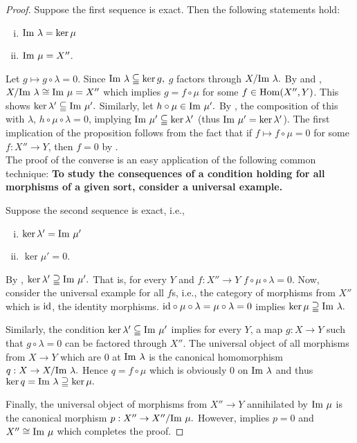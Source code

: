     
    \begin{proof}
    Suppose the first sequence is exact. Then the following statements hold:
    \begin{enumerate}[(i)]
        \item $\mathrm{Im}\  \lambda = \ker \mu$ \label{item:1}
        \item $\mathrm{Im}\  \mu = X''$.\label{item:2}
    \end{enumerate}
    Let $g \mapsto g \circ \lambda = 0$. Since $\mathrm{Im}\  \lambda \subseteqq  \ker g,$ $g$ factors through $X/\mathrm{Im}\  \lambda.$ By  and , $X/\mathrm{Im}\  \lambda \cong \mathrm{Im}\  \mu =  X''$ which implies $g = f \circ \mu$ for some $f \in \mathrm{Hom} (X'', Y)$. This shows $\ker \lambda' \subseteqq \mathrm{Im}\  \mu'.$ Similarly, let  $h \circ \mu \in \mathrm{Im}\  \mu'.$ By , the composition of this with $\lambda$, $h \circ \mu \circ \lambda = 0$, implying $\mathrm{Im}\  \mu' \subseteqq \ker \lambda'$ (thus $\mathrm{Im}\  \mu' = \ker \lambda'$).
    The first implication of the proposition follows from the fact that if $f \mapsto f \circ \mu = 0$ for some $f: X'' \to Y$, then $f = 0$  by .
    \\

    The proof of the converse is an easy application of the following common technique: \textbf{To study the consequences of a condition holding for all morphisms of a given sort, consider a universal example.}

    Suppose the second sequence is exact, i.e.,
    \begin{enumerate}[(i)]
        \item $\ker \lambda'  =  \mathrm{Im}\  \mu'$ \label{item:3}
        \item $\ker \mu' = 0$. \label{item:4}
    \end{enumerate}

    By ,  $\ker \lambda' \supseteqq  \mathrm{Im}\  \mu'.$ That is,  for every $Y$ and $f:X'' \to Y$ $f \circ \mu \circ \lambda = 0.$ Now, consider the universal example for all $f$s, i.e.,  the category of morphisms from $X''$ which is $\text{id}$, the identity morphisms. $\text{id} \circ \mu \circ \lambda  = \mu \circ \lambda = 0$ implies $\ker \mu \supseteqq \mathrm{Im}\  \lambda.$ 

    Similarly, the condition $\ker \lambda' \subseteqq \mathrm{Im}\  \mu' $ implies for every $Y$, a map $g: X \to Y$ such that $g \circ \lambda  = 0$  can be factored  through $X''.$ The universal object of all morphisms from $X \to Y$ which are $0$ at $\mathrm{Im}\  \lambda$ is the canonical homomorphism $q: X \to X/\mathrm{Im}\  \lambda.$ Hence $q = f \circ \mu$ which is obviously $0$ on $\mathrm{Im}\  \lambda$ and thus $\ker q = \mathrm{Im}\  \lambda \supseteqq \ker \mu.$
       
    Finally, the universal object of morphisms from $X'' \to Y$  annihilated by $\mathrm{Im}\  \mu$ is the canonical morphism $p:X'' \to X''/\mathrm{Im}\  \mu.$ However,  implies $p = 0$ and $X'' \cong \mathrm{Im}\  \mu$ which completes the proof.
    \end{proof}

